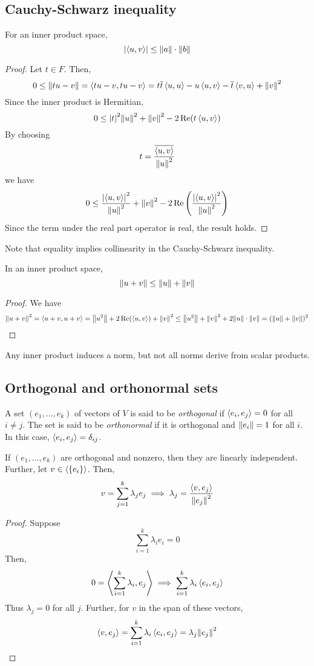 \subsection{Cauchy-Schwarz inequality}
\begin{lemma}
	For an inner product space,
	\[
		\abs{\left\langle{u,v}\right\rangle} \leq \norm{a} \cdot \norm{b}
	\]
\end{lemma}
\begin{proof}
	Let \( t \in F \).
	Then,
	\[
		0 \leq \norm{t u - v} = \left\langle{tu - v, tu - v}\right\rangle = t \overline t \left\langle{u,u}\right\rangle - u \left\langle{u,v}\right\rangle - \overline t \left\langle{v,u}\right\rangle + \norm{v}^2
	\]
	Since the inner product is Hermitian,
	\[
		0 \leq \abs{t}^2 \norm{u}^2 + \norm{v}^2 - 2 \Re(t \left\langle{u,v}\right\rangle)
	\]
	By choosing
	\[
		t = \frac{\overline{\left\langle{u,v}\right\rangle}}{\norm{u}^2}
	\]
	we have
	\[
		0 \leq \frac{\abs{\left\langle{u,v}\right\rangle}^2}{\norm{u}^2} + \norm{v}^2 - 2 \Re\qty(\frac{\abs{\left\langle{u,v}\right\rangle}^2}{\norm{u}^2})
	\]
	Since the term under the real part operator is real, the result holds.
\end{proof}
\noindent Note that equality implies collinearity in the Cauchy-Schwarz inequality.
\begin{corollary}
	In an inner product space,
	\[
		\norm{u+v} \leq \norm{u} + \norm{v}
	\]
\end{corollary}
\begin{proof}
	We have
	\[
		\norm{u+v}^2 = \left\langle{u+v, u+v}\right\rangle = \norm{u^2} + 2 \Re(\left\langle{u,v}\right\rangle) + \norm{v}^2 \leq \norm{u^2} + \norm{v}^2 + 2 \norm{u} \cdot \norm{v} = (\norm{u} + \norm{v})^2
	\]
\end{proof}
\begin{remark}
	Any inner product induces a norm, but not all norms derive from scalar products.
\end{remark}

\subsection{Orthogonal and orthonormal sets}
\begin{definition}
	A set \( (e_1, \dots, e_k) \) of vectors of \( V \) is said to be \textit{orthogonal} if \( \left\langle{e_i, e_j}\right\rangle = 0 \) for all \( i \neq j \).
	The set is said to be \textit{orthonormal} if it is orthogonal and \( \norm{e_i} = 1 \) for all \( i \).
	In this case, \( \left\langle{e_i, e_j}\right\rangle = \delta_{ij} \).
\end{definition}
\begin{lemma}
	If \( (e_1, \dots, e_k) \) are orthogonal and nonzero, then they are linearly independent.
	Further, let \( v \in \langle{} \qty{e_i} \rangle \).
	Then,
	\[
		v = \sum_{j=1}^k \lambda_j e_j \implies \lambda_j = \frac{\left\langle{v, e_j}\right\rangle}{\norm{e_j}^2}
	\]
\end{lemma}
\begin{proof}
	Suppose
	\[
		\sum_{i=1}^k \lambda_i e_i = 0
	\]
	Then,
	\[
		0 = \left\langle{\sum_{i=1}^k \lambda_i, e_j}\right\rangle \implies \sum_{i=1}^k \lambda_i \left\langle{e_i, e_j}\right\rangle
	\]
	Thus \( \lambda_j = 0 \) for all \( j \).
	Further, for \( v \) in the span of these vectors,
	\[
		\left\langle{v, e_j}\right\rangle = \sum_{i=1}^k \lambda_i \left\langle{e_i, e_j}\right\rangle = \lambda_j \norm{e_j}^2
	\]
\end{proof}

